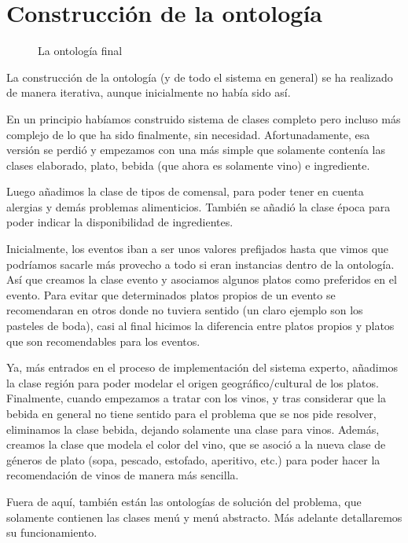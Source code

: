 % 

\section{Construcción de la ontología}

\begin{figure}[h!]
  \caption{La ontología final}
\end{figure}

La construcción de la ontología (y de todo el sistema en general) se ha
realizado de manera iterativa, aunque inicialmente no había sido así.

En un principio habíamos construido sistema de clases completo pero incluso más
complejo de lo que ha sido finalmente, sin necesidad. Afortunadamente, esa
versión se perdió y empezamos con una más simple que solamente contenía las
clases elaborado, plato, bebida (que ahora es solamente vino) e ingrediente.

Luego añadimos la clase de tipos de comensal, para poder tener en cuenta
alergias y demás problemas alimenticios. También se añadió la clase época para
poder indicar la disponibilidad de ingredientes.

Inicialmente, los eventos iban a ser unos valores prefijados hasta que vimos
que podríamos sacarle más provecho a todo si eran instancias dentro de la
ontología. Así que creamos la clase evento y asociamos algunos platos como
preferidos en el evento. Para evitar que determinados platos propios de un
evento se recomendaran en otros donde no tuviera sentido (un claro ejemplo son
los pasteles de boda), casi al final hicimos la diferencia entre platos propios
y platos que son recomendables para los eventos.

Ya, más entrados en el proceso de implementación del sistema experto, añadimos
la clase región para poder modelar el origen geográfico/cultural de los
platos. Finalmente, cuando empezamos a tratar con los vinos, y tras considerar
que la bebida en general no tiene sentido para el problema que se nos pide
resolver, eliminamos la clase bebida, dejando solamente una clase para
vinos. Además, creamos la clase que modela el color del vino, que se asoció a
la nueva clase de géneros de plato (sopa, pescado, estofado, aperitivo, etc.)
para poder hacer la recomendación de vinos de manera más sencilla.

Fuera de aquí, también están las ontologías de solución del problema, que
solamente contienen las clases menú y menú abstracto. Más adelante detallaremos
su funcionamiento.

